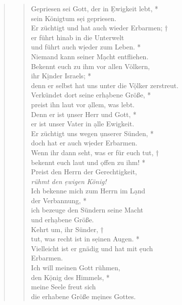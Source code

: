 \begin{quote}
\begin{verse}
Gepriesen sei Gott, der in \d Ewigkeit lebt, *\\
sein Königtum s\d ei gepriesen.\\ 
\vin Er züchtigt und hat auch wieder Erbarmen; †\\ 
\vin er führt hinab in die Unterwelt \\ 
\vin und führt auch w\d ieder zum Leben.  *\\ 
\vin Niemand kann seiner M\d acht entfliehen.\\ 
Bekennt euch zu ihm vor allen Völkern,\\
ihr K\d inder Israels; *\\ 
denn er selbst hat uns unter die V\d ölker zerstreut.\\ 
\vin Verkündet dort seine erh\d abene Größe, *\\ 
\vin preist ihn laut vor \d allem, was lebt.\\ 
Denn er ist \d unser Herr und Gott, *\\ 
er ist unser Vater in \d alle Ewigkeit.\\ 
\vin Er züchtigt uns wegen \d unserer Sünden, *\\ 
\vin doch hat er auch w\d ieder Erbarmen.\\ 
Wenn ihr dann seht, was er für euch tut,  †\\
bekennt euch laut und \d offen zu ihm! *\\ 
Preist den Herrn der Gerechtigkeit,\\
\textit{rühmt den \d ewigen König!}\\ 
\vin Ich bekenne mich zum Herrn im L\d and \\ 
\vin der Verbannung, *\\ 
\vin ich bezeuge den Sündern seine Macht\\ 
\vin und erh\d abene Größe.\\ 
Kehrt um, ihr Sünder,  †\\
tut, was recht ist in s\d einen Augen. *\\ 
Vielleicht ist er gnädig und hat mit \d euch\\
Erbarmen.\\ 
\vin Ich will meinen Gott rühmen,\\ 
\vin den K\d önig des Himmels, *\\ 
\vin meine Seele freut sich\\
 die erhabene Größe m\d eines Gottes.\\

\end{verse}
\end{quote}



